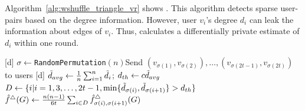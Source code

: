 Algorithm~\ref{alg:wshuffle_triangle_vr} shows \AlgWSTriVR{}.
This algorithm detects sparse user-pairs based on the degree information.
However, user $v_i$'s degree $d_i$ can leak the information about edges of $v_i$.
Thus, \AlgWSTriVR{} calculates a differentially private estimate of $d_i$ within one round.

\setlength{\algomargin}{5mm}
\begin{algorithm}[t]
  \SetAlgoLined
  [d] $\sigma \leftarrow$\texttt{RandomPermutation}$(n)$\;
  [d] Send $(v_{\sigma(1)}, v_{\sigma(2)}), \ldots, (v_{\sigma(2t-1)}, v_{\sigma(2t)})$ to users\;
  [d] $\tilde{d}_{avg} \leftarrow \frac{1}{n} \sum_{i=1}^n \tilde{d}_i$; $d_{th} \leftarrow c \tilde{d}_{avg}$\;
  [d] $D \leftarrow \{i | i = 1, 3, \ldots, 2t-1,
  \min\{\tilde{d}_{\sigma(i)}, \tilde{d}_{\sigma(i+1)}\} > d_{th}\}$\;
  [d] $\hat{f}^\triangle(G) \leftarrow \frac{n(n-1)}{6t} \sum_{i \in D} \hat{f}_{\sigma(i),\sigma(i+1)}^\triangle(G)$\;
  [d] 
  \caption{Our triangle counting algorithm with variance reduction \AlgWSTriVR{}.
  \AlgWSLE{} is shown in Algorithm~\ref{alg:WSLE}.
  }\label{alg:wshuffle_triangle_vr}
\end{algorithm}

